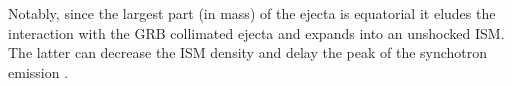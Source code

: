 Notably, since the largest part (in mass) of the ejecta is equatorial it eludes the 
interaction with the \ac{GRB} collimated ejecta and expands into an unshocked \ac{ISM}.
The latter can decrease the \ac{ISM} density and delay the peak of the 
synchotron emission \citep{2020MNRAS.495.4981M}.









